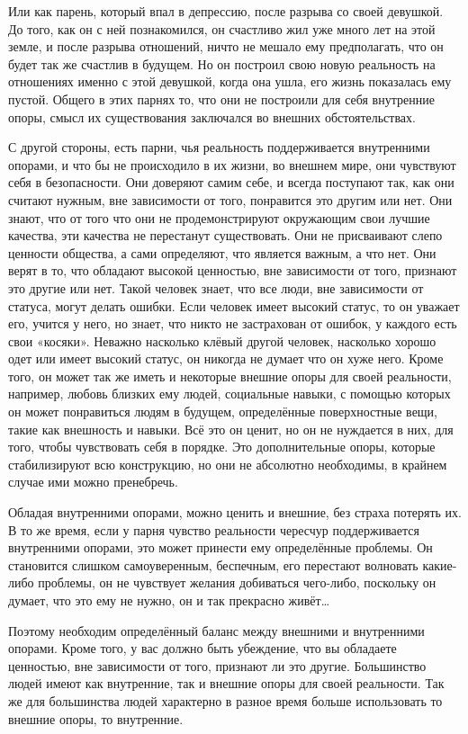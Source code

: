 Или как парень, который впал в депрессию, после разрыва со своей девушкой. До того, как он с ней познакомился, он счастливо жил уже много лет на этой земле, и после разрыва отношений, ничто не мешало ему предполагать, что он будет так же счастлив в будущем. Но он построил свою новую реальность на отношениях именно с этой девушкой, когда она ушла, его жизнь показалась ему пустой. Общего в этих парнях то, что они не построили для себя внутренние опоры, смысл их существования заключался во внешних обстоятельствах.

С другой стороны, есть парни, чья реальность поддерживается внутренними опорами, и что бы не происходило в их жизни, во внешнем мире, они чувствуют себя в безопасности. Они доверяют самим себе, и всегда поступают так, как они считают нужным, вне зависимости от того, понравится это другим или нет. Они знают, что от того что они не продемонстрируют окружающим свои лучшие качества, эти качества не перестанут существовать. Они не присваивают слепо ценности общества, а сами определяют, что является важным, а что нет. Они верят в то, что обладают высокой ценностью, вне зависимости от того, признают это другие или нет. Такой человек знает, что все люди, вне зависимости от статуса, могут делать ошибки. Если человек имеет высокий статус, то он уважает его, учится у него, но знает, что никто не застрахован от ошибок, у каждого есть свои «косяки». Неважно насколько клёвый другой человек, насколько хорошо одет или имеет высокий статус, он никогда не думает что он хуже него. Кроме того, он может так же иметь и некоторые внешние опоры для своей реальности, например, любовь близких ему людей, социальные навыки, с помощью которых он может понравиться людям в будущем, определённые поверхностные вещи, такие как внешность и навыки. Всё это он ценит, но он не нуждается в них, для того, чтобы чувствовать себя в порядке. Это дополнительные опоры, которые стабилизируют всю конструкцию, но они не абсолютно необходимы, в крайнем случае ими можно пренебречь.

Обладая внутренними опорами, можно ценить и внешние, без страха потерять их. В то же время, если у парня чувство реальности чересчур поддерживается внутренними опорами, это может принести ему определённые проблемы. Он становится слишком самоуверенным, беспечным, его перестают волновать какие-либо проблемы, он не чувствует желания добиваться чего-либо, поскольку он думает, что это ему не нужно, он и так прекрасно живёт\ldots

Поэтому необходим определённый баланс между внешними и внутренними опорами. Кроме того, у вас должно быть убеждение, что вы обладаете ценностью, вне зависимости от того, признают ли это другие. Большинство людей имеют как внутренние, так и внешние опоры для своей реальности. Так же для большинства людей характерно в разное время больше использовать то внешние опоры, то внутренние.

